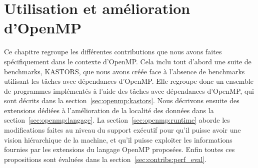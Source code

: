 

\chapter{Utilisation et amélioration d'OpenMP}\label{chap:contrib:openmp}
\chaptertoc


%




Ce chapitre regroupe les différentes contributions que nous avons faites spécifiquement dans le contexte d'OpenMP.
Cela inclu tout d'abord une suite de benchmarks, KASTORS, que nous avons créée face à l'absence de benchmarks utilisant les tâches avec dépendances d'OpenMP. Elle regroupe donc un ensemble de programmes implémentés à l'aide des tâches avec dépendances d'OpenMP, qui sont décrits dans la section~\ref{sec:openmp:kastors}.
Nous décrivons ensuite des extensions dédiées à l'amélioration de la localité des données dans la section~\ref{sec:openmp:langage}.
La section~\ref{sec:openmp:runtime} aborde les modifications faites au niveau du support exécutif pour qu'il puisse avoir une vision hiérarchique de la machine, et qu'il puisse exploiter les informations fournies par les extensions du langage OpenMP proposées.
Enfin toutes ces propositions sont évaluées dans la section~\ref{sec:contribs:perf_eval}.






